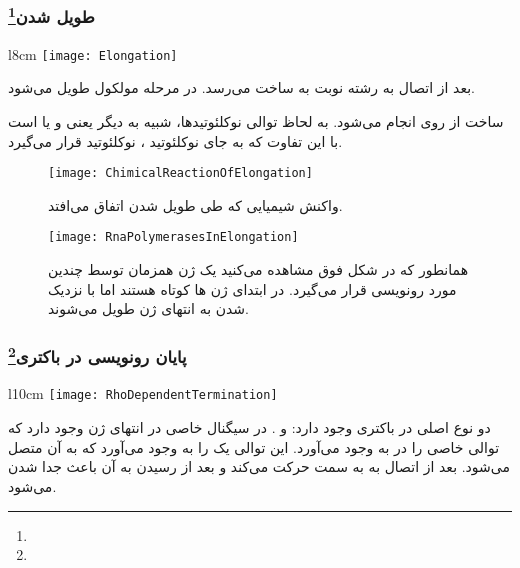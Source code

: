 \pagebreak
\subsubsection{طویل شدن\protect\footnote{}}

\begin{wrapfigure}[7]{l}{8cm}
\centering
\texttt{[image: Elongation]}
\end{wrapfigure}

بعد از اتصال
به رشته
نوبت به ساخت
می‌رسد. در مرحله
مولکول
طویل
\lr{(\textcolor{red}{long})}
می‌شود.

ساخت
از روی
انجام می‌شود. به لحاظ توالی نوکلئوتید‌ها،
شبیه به
دیگر یعنی
و یا
است با این تفاوت که به جای نوکلئوتید
، نوکلئوتید
قرار می‌گیرد.

\vspace{2cm}
\begin{figure}[htbp]
\centering
\texttt{[image: ChimicalReactionOfElongation]}
\caption{واکنش شیمیایی که طی طویل شدن اتفاق می‌افتد.}
\end{figure}

\begin{figure}[htbp]
\centering
\texttt{[image: RnaPolymerasesInElongation]}
\caption{همانطور که در شکل فوق مشاهده می‌کنید یک ژن همزمان توسط چندین
مورد رونویسی قرار می‌گیرد. در ابتدای ژن
ها کوتاه هستند اما با نزدیک شدن به انتهای ژن طویل می‌شوند.}
\end{figure}

\pagebreak
\subsubsection{پایان رونویسی در باکتری\protect\footnote{}}

\begin{wrapfigure}[10]{l}{10cm}
\centering
\texttt{[image: RhoDependentTermination]}
\end{wrapfigure}

دو نوع
اصلی در باکتری وجود دارد:
و
.
در
سیگنال خاصی در انتهای ژن وجود دارد که  توالی خاصی را در
به وجود می‌آورد. این توالی یک
را به وجود می‌آورد که
به آن متصل می‌شود.
بعد از اتصال به
به سمت
حرکت می‌کند و بعد از رسیدن به آن باعث جدا شدن می‌شود.


